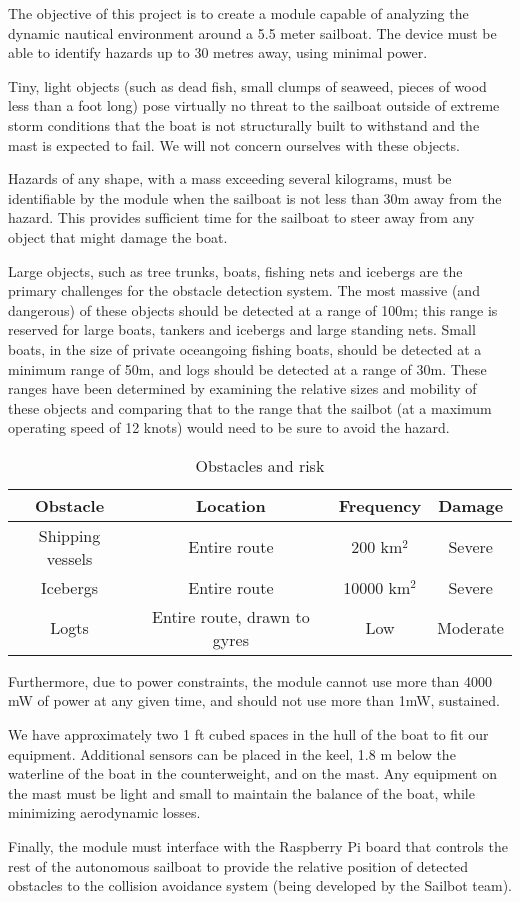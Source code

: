 The objective of this project is to create a module capable of analyzing the dynamic nautical environment around a 5.5 meter sailboat. The device must be able to identify hazards up to 30 metres away, using minimal power.

Tiny, light objects (such as dead fish, small clumps of seaweed, pieces of wood less than a foot long) pose virtually no threat to the sailboat outside of extreme storm conditions that the boat is not structurally built to withstand and the mast is expected to fail. We will not concern ourselves with these objects.

Hazards of any shape, with a mass exceeding several kilograms, must be identifiable by the module when the sailboat is not less than 30m away from the hazard. This provides sufficient time for the sailboat to steer away from any object that might damage the boat.

Large objects, such as tree trunks, boats, fishing nets and icebergs are the primary challenges for the obstacle detection system. The most massive (and dangerous) of these objects should be detected at a range of 100m; this range is reserved for large boats, tankers and icebergs and large standing nets. Small boats, in the size of private oceangoing fishing boats, should be detected at a minimum range of 50m, and logs should be detected at a range of 30m. These ranges have been determined by examining the relative sizes and mobility of these objects and comparing that to the range that the sailbot (at a maximum operating speed of 12 knots) would need to be sure to avoid the hazard.

\begin{table}
\caption{\label{tab:obstacles}Obstacles and risk}
\begin{tabular}{c|c|c|c}

Obstacle & Location & Frequency & Damage\\[0.6cm]
\hline

Shipping vessels & Entire route &200 km$^2$ & Severe \\
Icebergs & Entire route & 10000 km$^2$ & Severe \\
Logts & Entire route, drawn to gyres & Low & Moderate \\

\end{tabular}
\end{table}

Furthermore, due to power constraints, the module cannot use more than 4000 mW of power at any given time, and should not use more than 1mW, sustained.

We have approximately two 1 ft cubed spaces in the hull of the boat to fit our equipment. Additional sensors can be placed in the keel, 1.8 m below the waterline of the boat in the counterweight, and on the mast. Any equipment on the mast must be light and small to maintain the balance of the boat, while minimizing aerodynamic losses.

Finally, the module must interface with the Raspberry Pi board that controls the rest of the autonomous sailboat to provide the relative position of detected obstacles to the collision avoidance system (being developed by the Sailbot team).